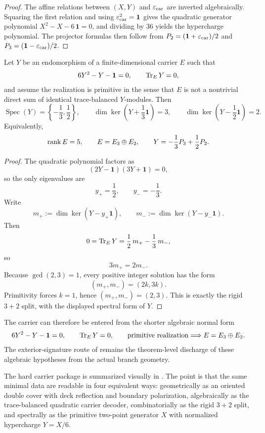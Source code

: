 \begin{proof}
The affine relations between $(X,Y)$ and $\varepsilon_{\mathrm{car}}$ are inverted algebraically. Squaring the first
relation and using $\varepsilon_{\mathrm{car}}^2=\mathbf 1$ gives the quadratic generator polynomial
$X^2-X-6\,\mathbf 1=0$, and dividing by $36$ yields the hypercharge polynomial. The projector
formulas then follow from $P_2=(\mathbf 1+\varepsilon_{\mathrm{car}})/2$ and $P_3=(\mathbf 1-\varepsilon_{\mathrm{car}})/2$.
\end{proof}

\begin{lemma}
\label{lem:primitive-trace-balanced-carrier}
Let $Y$ be an endomorphism of a finite-dimensional carrier $E$ such that
\[
6Y^2-Y-\mathbf 1=0,
\qquad
\operatorname{Tr}_EY=0,
\]
and assume the realization is primitive in the sense that $E$ is not a nontrivial direct sum of
identical trace-balanced $Y$-modules. Then
\[
\operatorname{Spec}(Y)=\left\{-\frac13,\frac12\right\},
\qquad
\dim\ker\!\left(Y+\frac13\mathbf 1\right)=3,
\qquad
\dim\ker\!\left(Y-\frac12\mathbf 1\right)=2.
\]
Equivalently,
\[
\operatorname{rank} E=5,
\qquad
E=E_3\oplus E_2,
\qquad
Y=-\frac13P_3+\frac12P_2.
\]
\end{lemma}

\begin{proof}
The quadratic polynomial factors as
\[
(2Y-\mathbf 1)(3Y+\mathbf 1)=0,
\]
so the only eigenvalues are
\[
y_+=\frac12,
\qquad
y_-=-\frac13.
\]
Write
\[
m_+:=\dim\ker(Y-y_+\mathbf 1),
\qquad
m_-:=\dim\ker(Y-y_-\mathbf 1).
\]
Then
\[
0=\operatorname{Tr}_EY=\frac12\,m_+-\frac13\,m_-,
\]
so
\[
3m_+=2m_-.
\]
Because $\gcd(2,3)=1$, every positive integer solution has the form
\[
(m_+,m_-)=(2k,3k).
\]
Primitivity forces $k=1$, hence $(m_+,m_-)=(2,3)$. This is exactly the rigid $3+2$ split, with
the displayed spectral form of $Y$.
\end{proof}

\begin{remark}
The carrier can therefore be entered from the shorter algebraic normal form
\[
6Y^2-Y-\mathbf 1=0,
\qquad
\operatorname{Tr}_EY=0,
\qquad
\text{primitive realization}
\Longrightarrow
E=E_3\oplus E_2.
\]
The exterior-signature route of  remains the theorem-level discharge
of these algebraic hypotheses from the actual branch geometry.
\end{remark}

The hard carrier package is summarized visually in . The point is
that the same minimal data are readable in four equivalent ways: geometrically as an oriented
double cover with deck reflection and boundary polarization, algebraically as the trace-balanced
quadratic carrier decoder, combinatorially as the rigid $3+2$ split, and spectrally as the
primitive two-point generator $X$ with normalized hypercharge $Y=X/6$.

